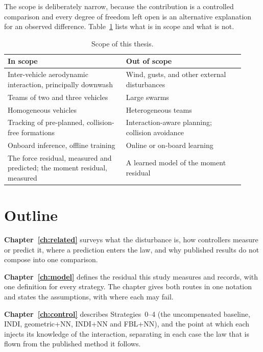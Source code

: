 The scope is deliberately narrow, because the contribution is a controlled comparison and every
degree of freedom left open is an alternative explanation for an observed difference.
Table~\ref{tab:intro-scope} lists what is in scope and what is not.

\begin{table}[h]
  \centering
  \caption{Scope of this thesis.}
  \label{tab:intro-scope}
  \small
  \begin{tabular}{@{}p{0.46\linewidth}p{0.46\linewidth}@{}}
    \toprule
    In scope & Out of scope \\
    \midrule
    Inter-vehicle aerodynamic interaction, principally downwash & Wind, gusts, and other external disturbances \\
    Teams of two and three vehicles & Large swarms \\
    Homogeneous vehicles & Heterogeneous teams \\
    Tracking of pre-planned, collision-free formations & Interaction-aware planning; collision avoidance \\
    Onboard inference, offline training & Online or on-board learning \\
    The force residual, measured and predicted; the moment residual, measured & A learned model of the moment residual \\
    \bottomrule
  \end{tabular}
\end{table}

\section{Outline}
\label{sec:intro-outline}

\textbf{Chapter~\ref{ch:related}} surveys what the disturbance is, how controllers measure or
predict it, where a prediction enters the law, and why published results do not compose into one
comparison.

\textbf{Chapter~\ref{ch:model}} defines the residual this study measures and records, with one
definition for every strategy. The
chapter gives both routes in one notation and states the assumptions, with where each may fail.

\textbf{Chapter~\ref{ch:control}} describes Strategies~0--4 (the uncompensated baseline, INDI,
geometric+NN, INDI+NN and FBL+NN), and the point at which each injects its knowledge of the
interaction, separating in each case the law that is flown from the published method it follows.

